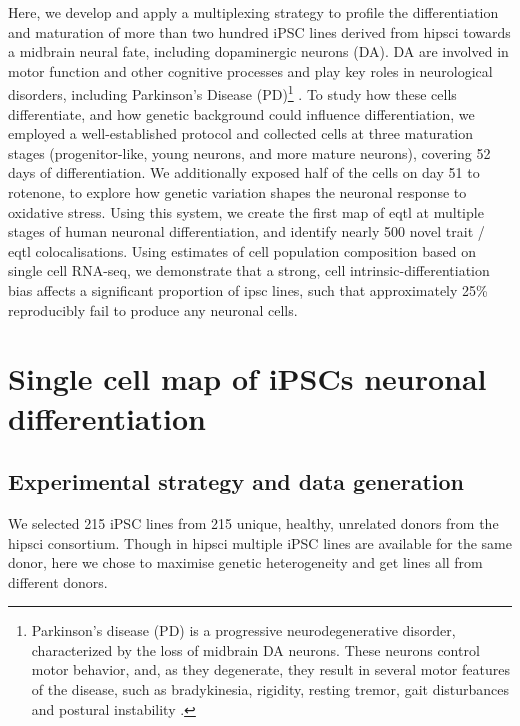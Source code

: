 Here, we develop and apply a multiplexing strategy to profile the differentiation and maturation of more than two hundred iPSC lines derived from \gls{hipsci} towards a midbrain neural fate, including dopaminergic neurons (DA). 
DA are involved in motor function and other cognitive processes and play key roles in neurological disorders, including Parkinson’s Disease (PD)\footnote{Parkinson’s disease (PD) is a progressive neurodegenerative disorder, characterized by the loss of midbrain DA neurons. 
These neurons control motor behavior, and, as they degenerate, they result in several motor features of the disease, such as bradykinesia, rigidity, resting tremor, gait disturbances and postural instability \cite{lees2009parkinsons}.} \cite{osborn2017seq, stoddard2020stem}. 
To study how these cells differentiate, and how genetic background could influence differentiation, we employed a well-established protocol \cite{kriks2011dopamine} and collected cells at three maturation stages (progenitor-like, young neurons, and more mature neurons), covering 52 days of differentiation. 
We additionally exposed half of the cells on day 51 to rotenone, to explore how genetic variation shapes the neuronal response to oxidative stress. 
Using this system, we create the first map of \gls{eqtl} at multiple stages of human neuronal differentiation, and identify nearly 500 novel trait / \gls{eqtl} colocalisations. 
Using estimates of cell population composition based on single cell RNA-seq, we demonstrate that a strong, cell intrinsic-differentiation bias affects a significant proportion of \gls{ipsc} lines, such that approximately 25\% reproducibly fail to produce any neuronal cells.\\




\newpage

\section{Single cell map of iPSCs neuronal differentiation}

\subsection{Experimental strategy and data generation}

We selected 215 iPSC lines from 215 unique, healthy, unrelated donors from the \gls{hipsci} consortium.
Though in \gls{hipsci} multiple iPSC lines are available for the same donor, here we chose to maximise genetic heterogeneity and get lines all from different donors.\\

